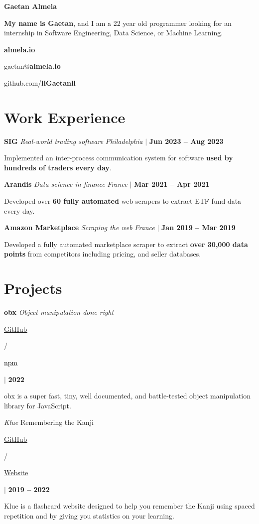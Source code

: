 \documentclass[12pt]{article}
\newcommand{\bigtitle}[5]{
  {\bf \large #1} \textemdash{} {\large \it #2} \hfill {#3}

  {\small #4}

  \smallskip

  #5 %

  \medskip
}
\newcommand{\link}[2]{
   \underline{{\href{#1}{#2}}}
}
\begin{document}
    {\fontsize{40}{50} \selectfont \bf \intertabular Gaetan Almela}

    \smallskip

    {\bf My name is Gaetan}, and I am a 22 year old programmer looking for an
    internship in Software Engineering, Data Science, or Machine Learning.

    \begin{center}
      \begin{multicols}{3}
       {\bf almela.io}

       gaetan@{\bf almela.io}

       github.com/{\bf llGaetanll}
      \end{multicols}
    \end{center}

    \section{Work Experience}

    \bigtitle{SIG}{Real-world trading software}
    {
      \textit{Philadelphia} $\Big|$ \textbf{Jun 2023 -- Aug 2023}
    }
    {}
    {
      Implemented an inter-process communication system for software {\bf used
      by hundreds of traders every day}.
    }

    \bigtitle{Arandis}{Data science in finance}
    {
      \textit{France} $\Big|$ \textbf{Mar 2021 -- Apr 2021}
    }
    {}
    {
       Developed over {\bf 60 fully automated} web scrapers to extract ETF fund data every day.
    }

    \bigtitle{Amazon Marketplace}{Scraping the web}
    {
      \textit{France} $\Big|$ \textbf{Jan 2019 -- Mar 2019}
    }
    {}
    {
       Developed a fully automated marketplace scraper to extract {\bf over 30,000
       data points} from competitors including pricing, and seller databases.
    }

    \section{Projects}

    \bigtitle{obx}{Object manipulation done right}
    {
      \link{https://github.com/llGaetanll/obx/}{GitHub}
      /
      \link{https://www.npmjs.com/package/@almela/obx}{npm}
      $\Big|$
      \textbf{2022}
    }
    {
       obx is a super fast, tiny, well documented, and battle-tested object
       manipulation library for JavaScript.
    }

    \bigtitle{Klue}{Remembering the Kanji}
    {
      \link{https://github.com/llGaetanll/Klue}{GitHub}
      /
      \link{https://klue.vercel.app/}{Website}
      $\Big|$
      \textbf{2019 -- 2022}
    }
    {
       Klue is a flashcard website designed to help you remember the Kanji
       using spaced repetition and by giving you statistics on your learning.
    }
\end{document}
